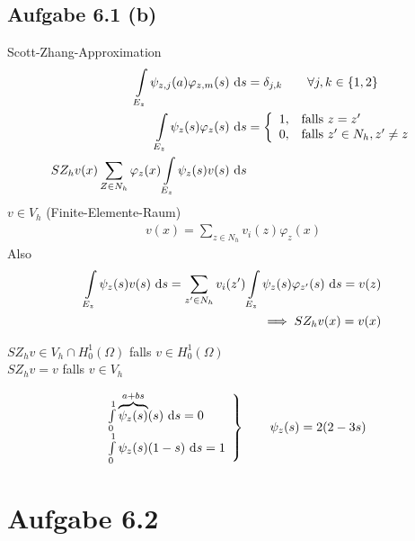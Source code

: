 \documentclass[12pt,a4paper]{article}
\begin{document}
\subsection*{Aufgabe 6.1 (b)}
Scott-Zhang-Approximation
\begin{align*}
	\int\limits_{E_z}\psi_{z,j}(a)\varphi_{z,m}(s)\text{ d} s
	&=\delta_{j,k}\qquad\forall j,k\in\lbrace1,2\rbrace\\
	\int\limits_{E_z}\psi_z(s)\varphi_z(s)\text{ d} s
	&=\left\lbrace\begin{array}{cl}
		1, &\text{falls } z=z'\\
		0, &\text{falls } z'\in N_h,z'\neq z
	\end{array}\right.\\
	SZ_h v(x)
	\sum\limits_{Z\in N_h}\varphi_z(x)\int\limits_{E_z}\psi_z(s)v(s)\text{ d} s
\end{align*}
$v\in V_h$ (Finite-Elemente-Raum)
\begin{align*}
	v(x)=\sum\limits_{z\in N_h} v_i(z)\varphi_z(x)
\end{align*}
Also
\begin{align*}
	\int\limits_{E_z}\psi_z(s)v(s)\text{ d} s
	=\sum\limits_{z'\in N_h} v_i(z')\int\limits_{E_z}\psi_z(s)\varphi_{z'}(s)\text{ d} s
	=v(z)\\
	\implies
	SZ_h v(x)=v(x)
\end{align*}

$SZ_h v\in V_h\cap H_0^1(\Omega)$ falls $v\in H_0^1(\Omega)$\\
$SZ_h v=v$ falls $v\in V_h$

\begin{align*}
	\left.\begin{array}{l}
			\int\limits_0^1\overbrace{\psi_z(s)}^{a+bs}(s)\text{ d} s=0\\
		\int\limits_0^1\psi_z(s)(1-s)\text{ d} s=1
	\end{array}\right\rbrace\qquad
	\psi_z(s)=2(2-3s)
\end{align*}

\section*{Aufgabe 6.2}
\end{document}
